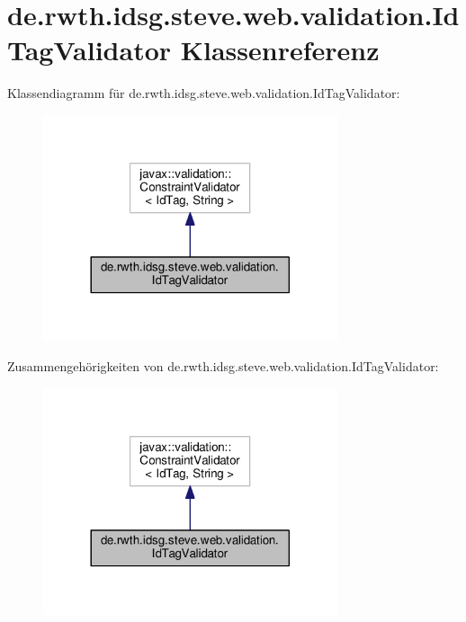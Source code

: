\hypertarget{classde_1_1rwth_1_1idsg_1_1steve_1_1web_1_1validation_1_1_id_tag_validator}{\section{de.\+rwth.\+idsg.\+steve.\+web.\+validation.\+Id\+Tag\+Validator Klassenreferenz}
\label{classde_1_1rwth_1_1idsg_1_1steve_1_1web_1_1validation_1_1_id_tag_validator}
}


Klassendiagramm für de.\+rwth.\+idsg.\+steve.\+web.\+validation.\+Id\+Tag\+Validator\+:\nopagebreak
\begin{figure}[H]
\begin{center}
\leavevmode
\includegraphics[width=245pt]{classde_1_1rwth_1_1idsg_1_1steve_1_1web_1_1validation_1_1_id_tag_validator__inherit__graph}
\end{center}
\end{figure}


Zusammengehörigkeiten von de.\+rwth.\+idsg.\+steve.\+web.\+validation.\+Id\+Tag\+Validator\+:\nopagebreak
\begin{figure}[H]
\begin{center}
\leavevmode
\includegraphics[width=245pt]{classde_1_1rwth_1_1idsg_1_1steve_1_1web_1_1validation_1_1_id_tag_validator__coll__graph}
\end{center}
\end{figure}
